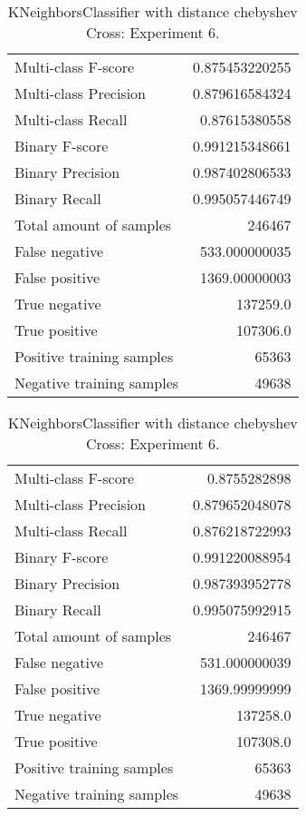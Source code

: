 \begin{table}[H]
\begin{minipage}{0.5\textwidth}
\caption{KNeighborsClassifier with distance chebyshev Cross: Experiment 5.}
\centering
\begin{tabular}{l r}
\toprule
Multi-class F-score & 0.875453220255 \\
Multi-class Precision & 0.879616584324 \\
Multi-class Recall & 0.87615380558 \\
\midrule
Binary F-score & 0.991215348661 \\
Binary Precision & 0.987402806533 \\
Binary Recall & 0.995057446749 \\
\midrule
Total amount of samples & 246467 \\
False negative & 533.000000035 \\
False positive & 1369.00000003 \\
True negative & 137259.0 \\
True positive & 107306.0 \\
\midrule
Positive training samples & 65363 \\
Negative training samples & 49638 \\
\bottomrule
\end{tabular}
\end{minipage}
\hfillx
\begin{minipage}{0.5\textwidth}
\caption{KNeighborsClassifier with distance chebyshev Cross: Experiment 6.}
\centering
\begin{tabular}{l r}
\toprule
Multi-class F-score & 0.8755282898 \\
Multi-class Precision & 0.879652048078 \\
Multi-class Recall & 0.876218722993 \\
\midrule
Binary F-score & 0.991220088954 \\
Binary Precision & 0.987393952778 \\
Binary Recall & 0.995075992915 \\
\midrule
Total amount of samples & 246467 \\
False negative & 531.000000039 \\
False positive & 1369.99999999 \\
True negative & 137258.0 \\
True positive & 107308.0 \\
\midrule
Positive training samples & 65363 \\
Negative training samples & 49638 \\
\bottomrule
\end{tabular}
\end{minipage}
\end{table}

